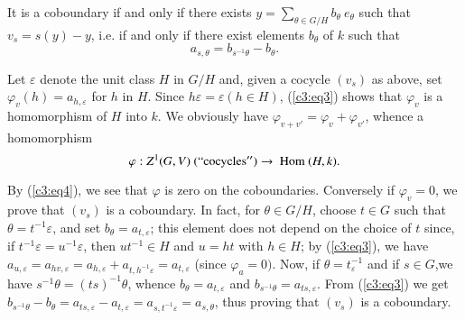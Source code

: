         \noindent
        It is a coboundary if and only if there exists $y =
        \sum\limits_{\theta \in G/H} b_ \theta ~ e_ \theta$ such that
        $v_s = s(y) - y$, i.e. if and only if there exist elements $b_
        \theta$ of $k$ such that 
        \begin{equation*}
a_{s, \theta } = b_{s^{-1} \theta} - b_\theta. \tag{4}\label{c3:eq4}
        \end{equation*}        
        
        Let $\varepsilon$ denote  the unit class $H$ in $G/H$ and,
        given a cocycle $(v_s)$ as above, set $\varphi_v(h) = a_{h,
          \varepsilon}$ for $h$ in $H$. Since $h \varepsilon =
        \varepsilon (h \in H)$, (\ref{c3:eq3}) shows that $\varphi_v$ is a
        homomorphism of $H$ into $k$. We obviously have $\varphi_{v
          +v'} = \varphi_v + \varphi_{v'}$, whence a homomorphism 
        $$
        \varphi : Z^1 (G, V) ~ (``\text{cocycles}'') \to \text{ Hom }
        (H, k).  
        $$
        
        By (\ref{c3:eq4}), we see that $\varphi$ is zero on the
        coboundaries. Conversely if $\varphi_v = 0$, we prove that
        $(v_s)$ is a coboundary. In fact, for $\theta \in G/H$, choose
        $t \in G$ such that $\theta = t^{-1} \varepsilon$, and set
        $b_\theta = a_{t, \varepsilon}$; this element does not depend
        on the choice of $t$ since, if $t^{-1} \varepsilon = u^{-1}
        \varepsilon  $, then $ut^{-1} \in H$ and $u = ht$ with $h \in
        H$; by (\ref{c3:eq3}), we have $a_{u, \varepsilon} = a_{h v,
          \varepsilon} = a_{h, \varepsilon} +  a_{t, h^{-1} \varepsilon}
        = a_{t, \varepsilon} $ (since $\varphi_a = 0)$. Now, if
        $\theta = t^{-1}_ \varepsilon$ and if $s \in G$,\pageoriginale  we have
        $s^{-1} \theta = (ts)^{-1} \theta $, whence $b_ \theta = a_{t,
          \varepsilon}$ and $b_{s^{-1} \theta} = a_{ts,
          \varepsilon}$. From (\ref{c3:eq3}) we get $b_{s^{-1} \theta} -
        b_\theta = a_{ts, \varepsilon} - a _{t, \varepsilon} = a_{s,
          t^{-1}\varepsilon} = a_{s, \theta}$, thus proving that
        $(v_s)$ is a coboundary.  
        
